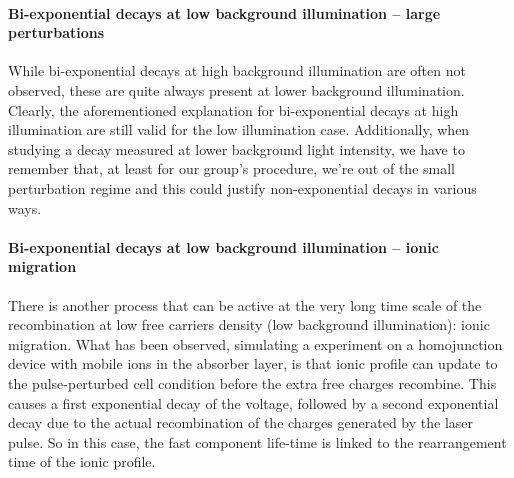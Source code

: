 	\paragraph{Bi-exponential decays at low background illumination -- large perturbations}
	While bi-exponential decays at high background illumination are often not observed, these are quite always present at lower background illumination.
	Clearly, the aforementioned explanation for bi-exponential decays at high illumination are still valid for the low illumination case.
	Additionally, when studying a decay measured at lower background light intensity, we have to remember that, at least for our group's  procedure, we're out of the small perturbation regime and this could justify non-exponential decays in various ways.

	\paragraph{Bi-exponential decays at low background illumination -- ionic migration}\label{tpv_biexp_lowlight_ions}
	There is another process that can be active at the very long time scale of the recombination at low free carriers density (low background illumination): ionic migration.
	What has been observed, simulating a  experiment on a homojunction device with mobile ions in the absorber layer, is that ionic profile can update to the pulse-perturbed cell condition before the extra free charges recombine.
	This causes a first exponential decay of the voltage, followed by a second exponential decay due to the actual recombination of the charges generated by the laser pulse.
	So in this case, the fast component life-time is linked to the rearrangement time of the ionic profile.

